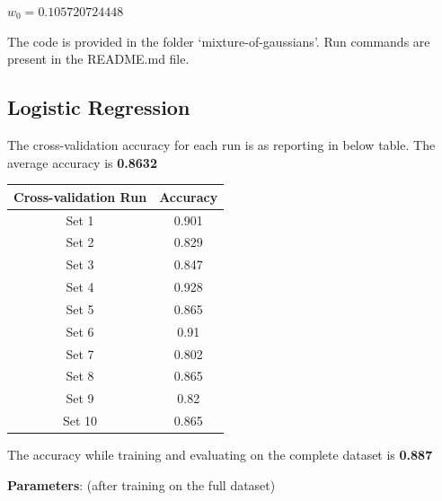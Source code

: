 \documentclass[a4paper]{article}
\begin{document}
\vspace{3mm}
$w_0 = 0.105720724448$

\vspace{3mm}

The code is provided in the folder `mixture-of-gaussians'. Run commands are present in the README.md file.

\newpage

\subsection{Logistic Regression} \label{logistic_regression_section}
The cross-validation accuracy for each run is as reporting in below table. The average accuracy is \textbf{0.8632}

\begin{center} 
	\begin{tabular}{ |c|c| } 
		\hline
		\textbf{Cross-validation Run} & \textbf{Accuracy} \\
		\hline
		\hline
		Set 1 & 0.901 \\
		\hline
		Set 2 & 0.829 \\
		\hline
		Set 3 & 0.847 \\
		\hline
		Set 4 & 0.928 \\
		\hline
		Set 5 & 0.865 \\
		\hline
		Set 6 & 0.91 \\
		\hline
		Set 7 & 0.802 \\
		\hline
		Set 8 & 0.865 \\
		\hline
		Set 9 & 0.82 \\
		\hline
		Set 10 & 0.865 \\
		\hline
	\end{tabular}
\end{center}

The accuracy while training and evaluating on the complete dataset is \textbf{0.887}

\vspace{3mm}

\textbf{Parameters}: (after training on the full dataset)

\vspace{3mm}
\end{document}

